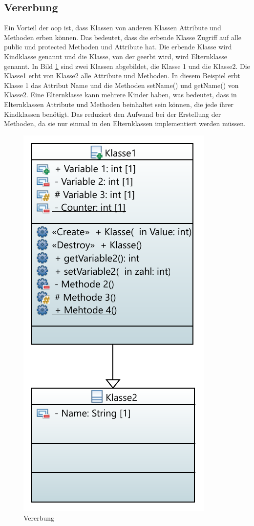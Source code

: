 \subsection{Vererbung}
Ein Vorteil der \ac{oop} ist, dass Klassen von anderen Klassen Attribute und Methoden erben können. Das bedeutet, dass die erbende Klasse Zugriff auf alle \glqq public\grqq{} und  \glqq protected\grqq{} Methoden und Attribute hat. Die erbende Klasse wird Kindklasse genannt und die Klasse, von der geerbt wird, wird Elternklasse genannt. In Bild \ref{fig:vererbung} sind zwei Klassen abgebildet, die Klasse 1 und die Klasse2. Die Klasse1 erbt von Klasse2 alle Attribute und Methoden. In diesem Beispiel erbt Klasse 1 das Attribut   \glqq Name\grqq{} und die Methoden  \glqq setName()\grqq{} und  \glqq getName()\grqq{} von Klasse2. Eine Elternklasse kann mehrere Kinder haben, was bedeutet, dass in Elternklassen Attribute und Methoden beinhaltet sein können, die jede ihrer Kindklassen benötigt. Das reduziert den Aufwand bei der Erstellung der Methoden, da sie nur einmal in den Elternklassen implementiert werden müssen.   
 \begin{figure}[H]
	\centering
		\includegraphics[scale=0.9]{bilder/pdfvorlagen/tes.pdf}
	\caption[Vererbung]{Vererbung}
	\label{fig:vererbung}
\end{figure}
